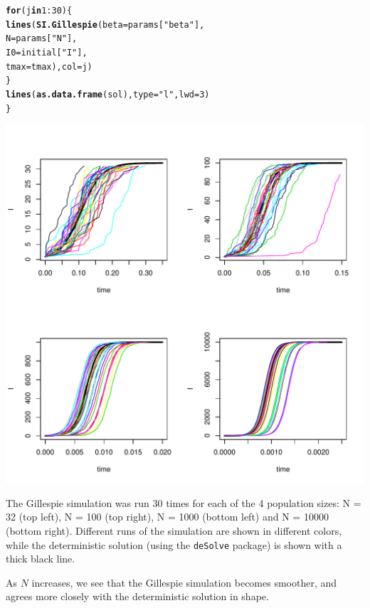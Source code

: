 \documentclass[12pt]{article}\usepackage[]{graphicx}\usepackage[]{color}
\makeatletter
\def\maxwidth{ %
  \ifdim\Gin@nat@width>\linewidth
    \linewidth
  \else
    \Gin@nat@width
  \fi
}
\newcommand{\hlnum}[1]{\textcolor[rgb]{0.686,0.059,0.569}{#1}}%
\newcommand{\hlstr}[1]{\textcolor[rgb]{0.192,0.494,0.8}{#1}}%
\newcommand{\hlopt}[1]{\textcolor[rgb]{0,0,0}{#1}}%
\newcommand{\hlstd}[1]{\textcolor[rgb]{0.345,0.345,0.345}{#1}}%
\newcommand{\hlkwa}[1]{\textcolor[rgb]{0.161,0.373,0.58}{\textbf{#1}}}%
\newcommand{\hlkwc}[1]{\textcolor[rgb]{0.333,0.667,0.333}{#1}}%
\newcommand{\hlkwd}[1]{\textcolor[rgb]{0.737,0.353,0.396}{\textbf{#1}}}%
\newenvironment{kframe}{%
 \def\at@end@of@kframe{}%
 \ifinner\ifhmode%
  \def\at@end@of@kframe{\end{minipage}}%
  \begin{minipage}{\columnwidth}%
 \fi\fi%
 \def\FrameCommand##1{\hskip\@totalleftmargin \hskip-\fboxsep
 \colorbox{shadecolor}{##1}\hskip-\fboxsep
     \hskip-\linewidth \hskip-\@totalleftmargin \hskip\columnwidth}%
 \MakeFramed {\advance\hsize-\width
   \@totalleftmargin\z@ \linewidth\hsize
   \@setminipage}}%
 {\par\unskip\endMakeFramed%
 \at@end@of@kframe}
\newenvironment{knitrout}{}{} %
\makeatother
\begin{document}
\begin{enumerate}[(a)]
\begin{knitrout}
\begin{kframe}
\begin{alltt}
  \hlkwa{for} \hlstd{(j} \hlkwa{in} \hlnum{1}\hlopt{:}\hlnum{30}\hlstd{)\{}
    \hlkwd{lines}\hlstd{(}\hlkwd{SI.Gillespie}\hlstd{(}\hlkwc{beta} \hlstd{= params[}\hlstr{"beta"}\hlstd{],}
                       \hlkwc{N} \hlstd{= params[}\hlstr{"N"}\hlstd{],}
                       \hlkwc{I0} \hlstd{= initial[}\hlstr{"I"}\hlstd{],}
                       \hlkwc{tmax} \hlstd{= tmax),} \hlkwc{col} \hlstd{= j)}
  \hlstd{\}}
  \hlkwd{lines}\hlstd{(}\hlkwd{as.data.frame}\hlstd{(sol),} \hlkwc{type} \hlstd{=} \hlstr{"l"}\hlstd{,} \hlkwc{lwd} \hlstd{=} \hlnum{3}\hlstd{)}
\hlstd{\}}
\end{alltt}
\end{kframe}
\includegraphics[width=\maxwidth]{figure/unnamed-chunk-8-1} 

\end{knitrout}

The Gillespie simulation was run 30 times for each of the 4 population sizes: N = 32 (top left), N = 100 (top right), N = 1000 (bottom left) and N = 10000 (bottom right). Different runs of the simulation are shown in different colors, while the deterministic solution (using the \texttt{deSolve} package) is shown with a thick black line. 

As $N$ increases, we see that the Gillespie simulation becomes smoother, and agrees more closely with the deterministic solution in shape. 

\end{enumerate}
\end{document}
